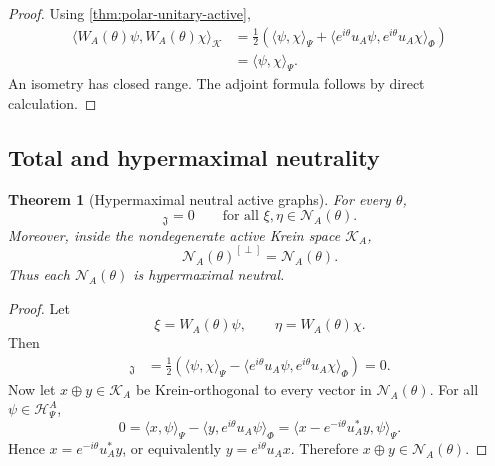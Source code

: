 \documentclass[11pt,reqno]{scrartcl}
\newcommand{\scrK}{\mathscr K}
\newcommand{\fundJ}{\mathfrak J}
\newcommand{\polA}{u_A}
\newcommand{\inner}[2]{\langle #1,#2\rangle}
\newcommand{\kInner}[2]{[#1,#2]_{\fundJ}}
\newcommand{\actHP}{\mathscr H_{\Psi}^{A}}
\newcommand{\actK}{\mathscr K_{A}}
\newcommand{\NAtheta}{\mathscr N_{A}(\theta)}
\newcommand{\WAtheta}{W_{A}(\theta)}
\theoremstyle{plain}
\newtheorem{theorem}{Theorem}[section]
\theoremstyle{definition}
\theoremstyle{remark}
\begin{document}
\begin{proof}
Using \cref{thm:polar-unitary-active},
\begin{align}
  \inner{\WAtheta\psi}{\WAtheta\chi}_{\scrK}
  &=\frac12\left(
      \inner{\psi}{\chi}_{\Psi}
      +\inner{e^{i\theta}\polA\psi}
              {e^{i\theta}\polA\chi}_{\Phi}
    \right)\\
  &=\inner{\psi}{\chi}_{\Psi}.
\end{align}
An isometry has closed range.  The adjoint formula follows by direct
calculation.
\end{proof}

\subsection{Total and hypermaximal neutrality}

\begin{theorem}[Hypermaximal neutral active graphs]
\label{thm:active-graphs-hypermaximal-neutral}
For every \(\theta\),
\begin{equation}
  \kInner{\xi}{\eta}=0
  \qquad
  \text{for all }\xi,\eta\in\NAtheta.
  \label{eq:active-total-neutrality}
\end{equation}
Moreover, inside the nondegenerate active Krein space \(\actK\),
\begin{equation}
  \NAtheta^{[\perp]}=\NAtheta.
  \label{eq:active-hypermax-neutrality}
\end{equation}
Thus each \(\NAtheta\) is hypermaximal neutral.
\end{theorem}

\begin{proof}
Let
\begin{equation}
  \xi=\WAtheta\psi,
  \qquad
  \eta=\WAtheta\chi.
\end{equation}
Then
\begin{align}
  \kInner{\xi}{\eta}
  &=\frac12\left(
      \inner{\psi}{\chi}_{\Psi}
      -\inner{e^{i\theta}\polA\psi}
              {e^{i\theta}\polA\chi}_{\Phi}
    \right)=0.
\end{align}
Now let \(x\oplus y\in\actK\) be Krein-orthogonal to every vector in
\(\NAtheta\).  For all \(\psi\in\actHP\),
\begin{equation}
  0
  =\inner{x}{\psi}_{\Psi}
   -\inner{y}{e^{i\theta}\polA\psi}_{\Phi}
  =\inner{x-e^{-i\theta}\polA^*y}{\psi}_{\Psi}.
\end{equation}
Hence \(x=e^{-i\theta}\polA^*y\), or equivalently
\(y=e^{i\theta}\polA x\).  Therefore \(x\oplus y\in\NAtheta\).
\end{proof}
\end{document}
